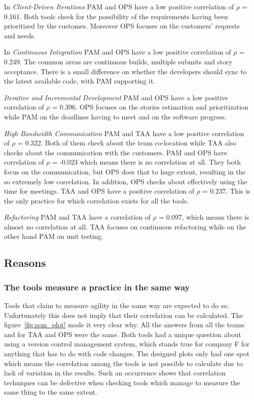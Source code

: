 In \textit{Client-Driven Iterations} PAM and OPS have a low positive correlation of $\rho$ = 0.161. Both tools check for  the possibility of the requirements having been prioritized by the customer. Moreover OPS focuses on the customers' requests and needs.

In \textit{Continuous Integration} PAM and OPS have a low positive correlation of $\rho$ = 0.249. The common areas are continuous builds, multiple submits and story acceptance. There is a small difference on whether the developers should sync to the latest available code, with PAM supporting it. 

\textit{Iterative and Incremental Development} PAM and OPS have a low positive correlation of $\rho$ = 0.396. OPS focuses on the stories estimation and prioritization while PAM on the deadlines having to meet and on the software progress. 

\textit{High Bandwidth Communication} PAM and TAA have a low positive correlation of $\rho$ = 0.322. Both of them check about the team co-location while TAA also checks about the communication with the customers. PAM and OPS have correlation of $\rho$ = -0.023 which means there is no correlation at all. They both focus on the communication, but OPS does that to huge extent, resulting in the so extremely low correlation. In addition, OPS checks about effectively using the time for meetings. TAA and OPS have a positive correlation of $\rho$ = 0.237. This is the only practice for which correlation exists for all the tools.

\textit{Refactoring} PAM and TAA have a correlation of $\rho$ = 0.097, which means there is almost no correlation at all. TAA focuses on continuous refactoring while on the other hand PAM on unit testing.


\subsection{Reasons}

\subsubsection{The tools measure a practice in the same way}
Tools that claim to measure agility in the same way are expected to do so. Unfortunately this does not imply that their correlation can be calculated. The figure~\ref{fig:scm_plot} made it very clear why. All the answers from all the teams and for TAA and OPS were the same. Both tools had a unique question about using a version control management system, which stands true for company F for anything that has to do with code changes. The designed plots only had one spot which means the correlation among the tools is not possible to calculate due to lack of variation in the results. Such an occurrence shows that correlation techniques can be defective when checking tools which manage to measure the same thing to the same extent.

